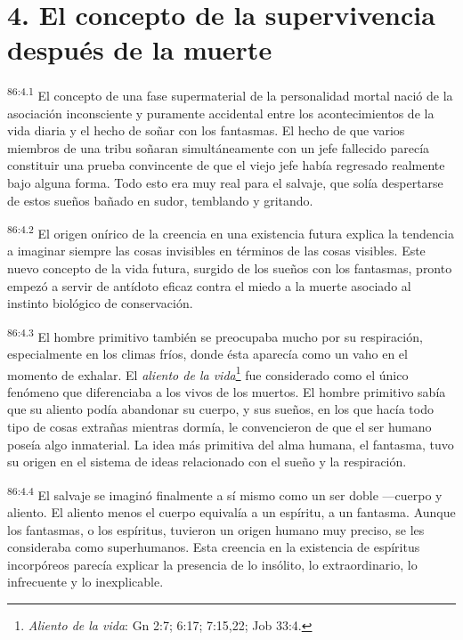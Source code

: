 \documentclass[twoside, 11pt]{book}
\begin{document}
\section*{4. El concepto de la supervivencia después de la muerte}
\par
\textsuperscript{86:4.1} El concepto de una fase supermaterial de la personalidad mortal nació de la asociación inconsciente y puramente accidental entre los acontecimientos de la vida diaria y el hecho de soñar con los fantasmas. El hecho de que varios miembros de una tribu soñaran simultáneamente con un jefe fallecido parecía constituir una prueba convincente de que el viejo jefe había regresado realmente bajo alguna forma. Todo esto era muy real para el salvaje, que solía despertarse de estos sueños bañado en sudor, temblando y gritando.

\par
\textsuperscript{86:4.2} El origen onírico de la creencia en una existencia futura explica la tendencia a imaginar siempre las cosas invisibles en términos de las cosas visibles. Este nuevo concepto de la vida futura, surgido de los sueños con los fantasmas, pronto empezó a servir de antídoto eficaz contra el miedo a la muerte asociado al instinto biológico de conservación.

\par
\textsuperscript{86:4.3} El hombre primitivo también se preocupaba mucho por su respiración, especialmente en los climas fríos, donde ésta aparecía como un vaho en el momento de exhalar. El \textit{aliento de la vida}\footnote{\textit{Aliento de la vida}: Gn 2:7; 6:17; 7:15,22; Job 33:4.} fue considerado como el único fenómeno que diferenciaba a los vivos de los muertos. El hombre primitivo sabía que su aliento podía abandonar su cuerpo, y sus sueños, en los que hacía todo tipo de cosas extrañas mientras dormía, le convencieron de que el ser humano poseía algo inmaterial. La idea más primitiva del alma humana, el fantasma, tuvo su origen en el sistema de ideas relacionado con el sueño y la respiración.

\par
\textsuperscript{86:4.4} El salvaje se imaginó finalmente a sí mismo como un ser doble ---cuerpo y aliento. El aliento menos el cuerpo equivalía a un espíritu, a un fantasma. Aunque los fantasmas, o los espíritus, tuvieron un origen humano muy preciso, se les consideraba como superhumanos. Esta creencia en la existencia de espíritus incorpóreos parecía explicar la presencia de lo insólito, lo extraordinario, lo infrecuente y lo inexplicable.
\end{document}
